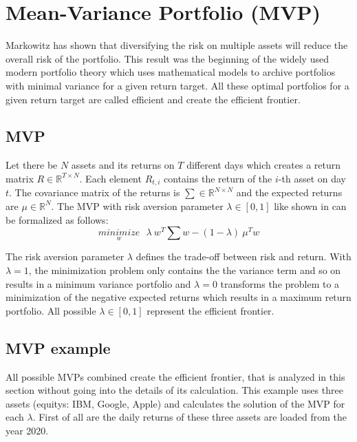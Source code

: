 \documentclass[
  oneside]{book}
\begin{document}
\hypertarget{mean-variance-portfolio-mvp}{%
\section{Mean-Variance Portfolio (MVP)}\label{mean-variance-portfolio-mvp}}

Markowitz has shown that diversifying the risk on multiple assets will reduce the overall risk of the portfolio. This result was the beginning of the widely used modern portfolio theory which uses mathematical models to archive portfolios with minimal variance for a given return target. All these optimal portfolios for a given return target are called efficient and create the efficient frontier.

\hypertarget{mvp}{%
\subsection{MVP}\label{mvp}}

Let there be \(N\) assets and its returns on \(T\) different days which creates a return matrix \(R \in \mathbb{R}^{T \times N}\). Each element \(R_{t,i}\) contains the return of the \(i\)-th asset on day \(t\). The covariance matrix of the returns is \(\textstyle\sum \in \mathbb{R}^{N \times N}\) and the expected returns are \(\mu \in \mathbb{R}^{N}\). The MVP with risk aversion parameter \(\lambda \in [0,1]\) like shown in \citep{Mari2005} can be formalized as follows:
\begin{equation} 
\underset{w}{minimize} \ \ \ \lambda \ w^T \textstyle\sum w - (1-\lambda) \ \mu^T w
\label{eq:MVP}
\end{equation}

The risk aversion parameter \(\lambda\) defines the trade-off between risk and return. With \(\lambda = 1\), the minimization problem only contains the the variance term and so on results in a minimum variance portfolio and \(\lambda = 0\) transforms the problem to a minimization of the negative expected returns which results in a maximum return portfolio. All possible \(\lambda \in [0, 1]\) represent the efficient frontier.

\hypertarget{mvp-example}{%
\subsection{MVP example}\label{mvp-example}}

All possible MVPs combined create the efficient frontier, that is analyzed in this section without going into the details of its calculation. This example uses three assets (equitys: IBM, Google, Apple) and calculates the solution of the MVP for each \(\lambda\). First of all are the daily returns of these three assets are loaded from the year 2020.
\end{document}
